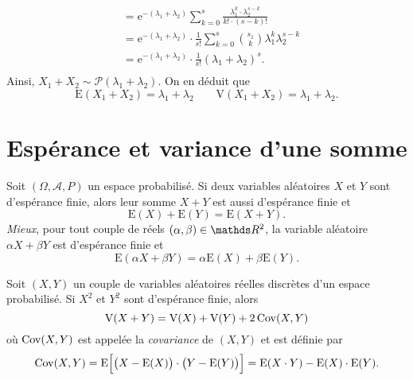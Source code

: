 \begin{exo}
\begin{enumerate}
\begin{align*}
				&= \mathrm{e}^{-(\lambda_1 + \lambda_2)} \sum_{k=0}^s \frac{\lambda_1^k \cdot \lambda_2^{s - k}}{k! \cdot (s-k)!} \\
				&= \mathrm{e}^{-(\lambda_1 + \lambda_2)} \cdot \frac{1}{s!} \sum_{k=0}^s {s_1 \choose k} \lambda_1^k \lambda_2^{s-k}  \\
				&= \mathrm{e}^{-(\lambda_1+\lambda_2)} \cdot\frac{1}{s!} (\lambda_1 + \lambda_2)^s. \\
			\end{align*}
			Ainsi, $X_1 + X_2 \sim \mathcal{P}(\lambda_1 + \lambda_2)$. On en déduit que \[
				\mathrm{E}(X_1 + X_2) = \lambda_1 + \lambda_2 \quad\quad \mathrm{V}(X_1 + X_2) = \lambda_1 + \lambda_2
			.\]
	\end{enumerate}
\end{exo}

\section{Espérance et variance d'une somme}

\begin{prop}
	Soit $(\Omega, \mathcal{A}, P)$ un espace probabilisé. Si deux variables aléatoires $X$ et $Y$ sont d'espérance finie, alors leur somme $X+Y$ est aussi d'espérance finie et \[
		\mathrm{E}(X) + \mathrm{E}(Y) = \mathrm{E}(X + Y)
	.\]\textit{Mieux}, pour tout couple de réels $(\alpha, \beta) \in \R^2$, la variable aléatoire $\alpha X + \beta Y$ est d'espérance finie et \[
		\mathrm{E}(\alpha X + \beta Y) = \alpha\mathrm{E}(X) + \beta \mathrm{E}(Y)
	.\]
\end{prop}

\begin{prop-defn}
	Soit $(X,Y)$ un couple de variables aléatoires réelles discrètes d'un espace probabilisé. Si $X^2$ et $Y^2$	sont d'espérance finie, alors \[
		\mathrm{V}(X + Y) = \mathrm{V}(X) + \mathrm{V}(Y) + 2\operatorname{Cov}(X, Y)
	\] où $\operatorname{Cov}(X, Y)$ est appelée la \textit{covariance} de $(X, Y)$ et est définie par \[
		\operatorname{Cov}(X, Y) = \mathrm{E}\Big[\big(X - \mathrm{E}(X)\big) \cdot \big(Y - \mathrm{E}(Y)\big)\Big] = \mathrm{E}(X \cdot Y) - \mathrm{E}(X) \cdot \mathrm{E}(Y)
	.\]
\end{prop-defn}

